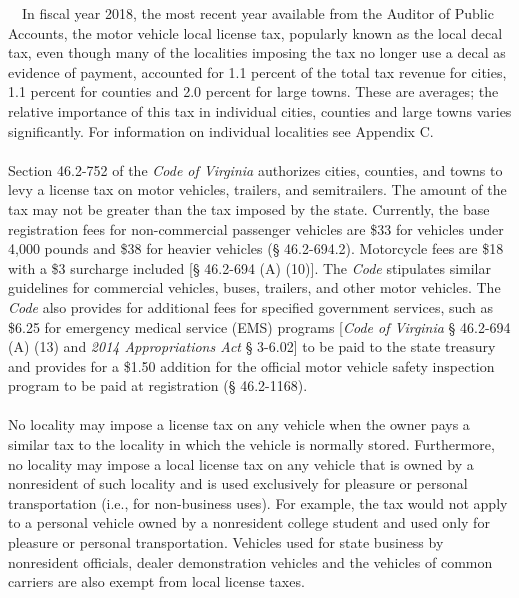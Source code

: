 \documentclass[
]{book}
\begin{document}
~~In fiscal year 2018, the most recent year available from the Auditor of Public Accounts, the motor vehicle local license tax, popularly known as the local decal tax, even though many of the localities imposing the tax no longer use a decal as evidence of payment, accounted for 1.1 percent of the total tax revenue for cities, 1.1 percent for counties and 2.0 percent for large towns. These are averages; the relative importance of this tax in individual cities, counties and large towns varies significantly. For information on individual localities see Appendix C.\\
~\\
\hspace*{0.333em}\hspace*{0.333em}Section 46.2-752 of the \emph{Code of Virginia} authorizes cities, counties, and towns to levy a license tax on motor vehicles, trailers, and semitrailers. The amount of the tax may not be greater than the tax imposed by the state. Currently, the base registration fees for non-commercial passenger vehicles are \$33 for vehicles under 4,000 pounds and \$38 for heavier vehicles (§ 46.2-694.2). Motorcycle fees are \$18 with a \$3 surcharge included {[}§ 46.2-694 (A) (10){]}. The \emph{Code} stipulates similar guidelines for commercial vehicles, buses, trailers, and other motor vehicles. The \emph{Code} also provides for additional fees for specified government services, such as \$6.25 for emergency medical service (EMS) programs {[}\emph{Code of Virginia} § 46.2-694 (A) (13) and \emph{2014 Appropriations Act} § 3-6.02{]} to be paid to the state treasury and provides for a \$1.50 addition for the official motor vehicle safety inspection program to be paid at registration (§ 46.2-1168).\\
~\\
\hspace*{0.333em}\hspace*{0.333em}No locality may impose a license tax on any vehicle when the owner pays a similar tax to the locality in which the vehicle is normally stored. Furthermore, no locality may impose a local license tax on any vehicle that is owned by a nonresident of such locality and is used exclusively for pleasure or personal transportation (i.e., for non-business uses). For example, the tax would not apply to a personal vehicle owned by a nonresident college student and used only for pleasure or personal transportation. Vehicles used for state business by nonresident officials, dealer demonstration vehicles and the vehicles of common carriers are also exempt from local license taxes.\\
\end{document}
